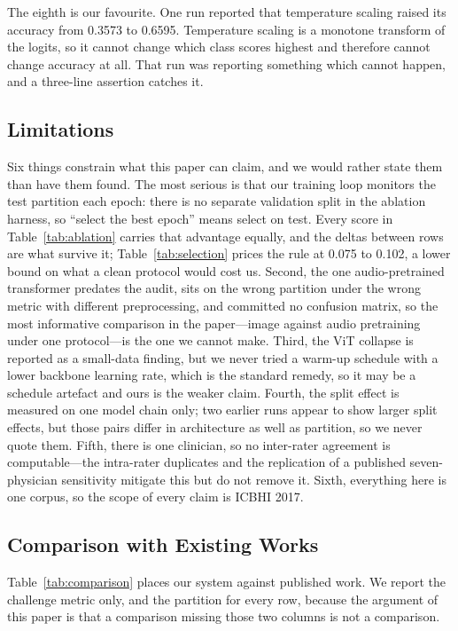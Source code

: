 \documentclass[journal,onecolumn]{IEEEtran}
\begin{document}
The eighth is our favourite. One run reported that temperature scaling raised its accuracy from
0.3573 to 0.6595. Temperature scaling is a monotone transform of the logits, so it cannot change
which class scores highest and therefore cannot change accuracy at all. That run was reporting
something which cannot happen, and a three-line assertion catches it.

\subsection{Limitations}
\label{subsec:limitations}

Six things constrain what this paper can claim, and we would rather state them than have them
found. The most serious is that our training loop monitors the test partition each epoch: there
is no separate validation split in the ablation harness, so ``select the best epoch'' means
select on test. Every score in Table~\ref{tab:ablation} carries that advantage equally, and the
deltas between rows are what survive it; Table~\ref{tab:selection} prices the rule at 0.075 to
0.102, a lower bound on what a clean protocol would cost us. Second, the one audio-pretrained
transformer predates the audit, sits on the wrong partition under the wrong metric with
different preprocessing, and committed no confusion matrix, so the most informative comparison
in the paper---image against audio pretraining under one protocol---is the one we cannot
make. Third, the ViT collapse is reported as a small-data finding, but we never tried a warm-up
schedule with a lower backbone learning rate, which is the standard remedy, so it may be a
schedule artefact and ours is the weaker claim. Fourth, the split effect is measured on one
model chain only; two earlier runs appear to show larger split effects, but those pairs differ
in architecture as well as partition, so we never quote them. Fifth, there is one clinician, so
no inter-rater agreement is computable---the intra-rater duplicates and the replication of a
published seven-physician sensitivity mitigate this but do not remove it. Sixth, everything here
is one corpus, so the scope of every claim is ICBHI 2017.

\subsection{Comparison with Existing Works}
\label{subsec:comparison}

Table~\ref{tab:comparison} places our system against published work. We report the challenge
metric only, and the partition for every row, because the argument of this paper is that a
comparison missing those two columns is not a comparison.
\end{document}

